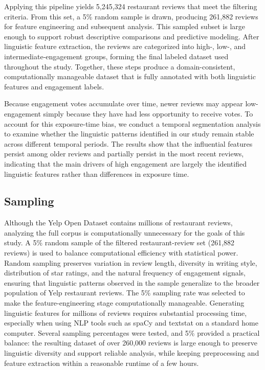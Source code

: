 \documentclass[12pt]{article}
\begin{document}
Applying this pipeline yields 5,245,324 restaurant reviews that meet the filtering criteria. From this set, a 5\% random sample is drawn, producing 261,882 reviews for feature engineering and subsequent analysis. This sampled subset is large enough to support robust descriptive comparisons and predictive modeling. After linguistic feature extraction, the reviews are categorized into high-, low-, and intermediate-engagement groups, forming the final labeled dataset used throughout the study. Together, these steps produce a domain-consistent, computationally manageable dataset that is fully annotated with both linguistic features and engagement labels.

Because engagement votes accumulate over time, newer reviews may appear low-engagement simply because they have had less opportunity to receive votes. To account for this exposure-time bias, we conduct a temporal segmentation analysis to examine whether the linguistic patterns identified in our study remain stable across different temporal periods. The results show that the influential features persist among older reviews and partially persist in the most recent reviews, indicating that the main drivers of high engagement are largely the identified linguistic features rather than differences in exposure time.

\subsection{Sampling}

Although the Yelp Open Dataset contains millions of restaurant reviews, analyzing the full corpus is computationally unnecessary for the goals of this study. A 5\% random sample of the filtered restaurant-review set (261,882 reviews) is used to balance computational efficiency with statistical power. Random sampling preserves variation in review length, diversity in writing style, distribution of star ratings, and the natural frequency of engagement signals, ensuring that linguistic patterns observed in the sample generalize to the broader population of Yelp restaurant reviews. The 5\% sampling rate was selected to make the feature-engineering stage computationally manageable. Generating linguistic features for millions of reviews requires substantial processing time, especially when using NLP tools such as spaCy and textstat on a standard home computer. Several sampling percentages were tested, and 5\% provided a practical balance: the resulting dataset of over 260,000 reviews is large enough to preserve linguistic diversity and support reliable analysis, while keeping preprocessing and feature extraction within a reasonable runtime of a few hours.
\end{document}

